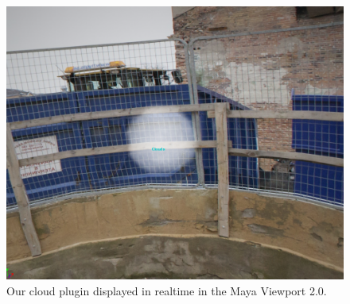 \documentclass[11pt,twocolumn]{article}
\begin{document}
\begin{figure}
\includegraphics[width=\textwidth]{figures/cloudlol.png}
\caption{Our cloud plugin displayed in realtime in the Maya Viewport 2.0.}
\label{fig:mayaviewport_final}
\end{figure}

\endgroup
\newpage

\nocite{*}

\end{document}
